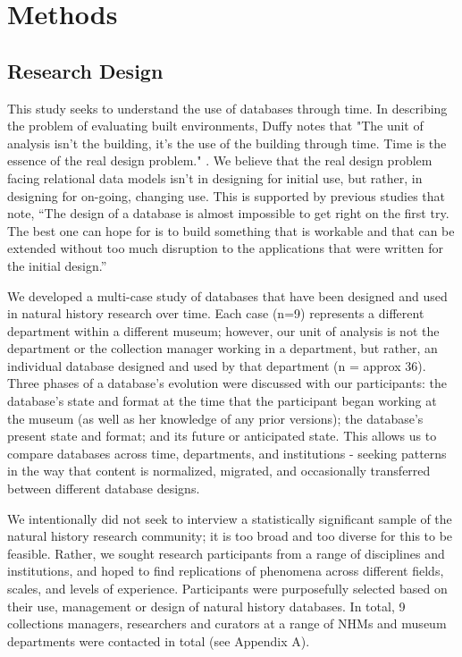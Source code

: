 \section{Methods}

\subsection{Research Design}

This study seeks to understand the use of databases through time. In describing the problem of evaluating built environments, Duffy notes that "The unit of analysis isn't the building, it's the use of the building through time. Time is the essence of the real design problem." \cite{duffy1990measuring}. We believe that the real design problem facing relational data models isn't in designing for initial use, but rather, in designing for on-going, changing use. This is supported by previous studies that note, “The design of a database is almost impossible to get right on the first try. The best one can hope for is to build something that is workable and that can be extended without too much disruption to the applications that were written for the initial design.” \cite{buneman2008curated}

We developed a multi-case study of databases that have been designed and used in natural history research over time. Each case (n=9) represents a different department within a different museum; however, our unit of analysis is not the department or the collection manager working in a department, but rather, an individual database designed and used by that department (n = approx 36). Three phases of a database's evolution were discussed with our participants: the database's state and format at the time that the participant began working at the museum (as well as her knowledge of any prior versions); the database's present state and format; and its future or anticipated state. This allows us to compare databases across time, departments, and institutions - seeking patterns in the way that content is normalized, migrated, and occasionally transferred between different database designs. 

We intentionally did not seek to interview a statistically significant sample of the natural history research community; it is too broad and too diverse for this to be feasible. Rather, we sought research participants from a range of disciplines and institutions, and hoped to find replications of phenomena across different fields, scales, and levels of experience. Participants were purposefully selected based on their use, management or design of natural history databases. In total, 9 collections managers, researchers and curators at a range of NHMs and museum departments were contacted in total (see Appendix A).


